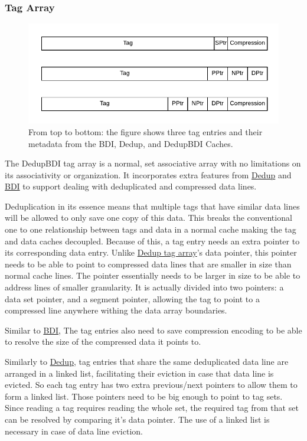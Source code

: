\subsubsection{Tag Array}
\label{sssec:DedupBDITag}
\begin{figure}
    \includegraphics[width=\textwidth]{BDIvsDedupvsDedupBDI_Tag.pdf}
    \caption[DedupBDI Tag Array]{From top to bottom: the figure shows three tag entries and their metadata from the BDI, Dedup, and DedupBDI Caches.}
    \label{fig:DedupBDI_Tag}
\end{figure}
The DedupBDI tag array is a normal, set associative array with no limitations on its associativity or organization. It incorporates extra features from \hyperref[sssec:DedupTag]{Dedup} and \hyperref[sssec:BDITag]{BDI} to support dealing with deduplicated and compressed data lines.\par
Deduplication in its essence means that multiple tags that have similar data lines will be allowed to only save one copy of this data. This breaks the conventional one to one relationship between tags and data in a normal cache making the tag and data caches decoupled. Because of this, a tag entry needs an extra pointer to its corresponding data entry. Unlike \hyperref[sssec:DedupTag]{Dedup tag array}'s data pointer, this pointer needs to be able to point to compressed data lines that are smaller in size than normal cache lines. The pointer essentially needs to be larger in size to be able to address lines of smaller granularity. It is actually divided into two pointers: a data set pointer, and a segment pointer, allowing the tag to point to a compressed line anywhere withing the data array boundaries.\par
Similar to \hyperref[sssec:BDITag]{BDI}, The tag entries also need to save compression encoding to be able to resolve the size of the compressed data it points to.\par
Similarly to \hyperref[sssec:DedupTag]{Dedup}, tag entries that share the same deduplicated data line are arranged in a linked list, facilitating their eviction in case that data line is evicted. So each tag entry has two extra previous/next pointers to allow them to form a linked list. Those pointers need to be big enough to point to tag sets. Since reading a tag requires reading the whole set, the required tag from that set can be resolved by comparing it's data pointer. The use of a linked list is necessary in case of data line eviction.\par
